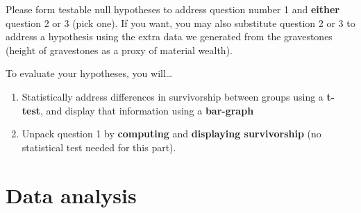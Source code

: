 \documentclass[]{krantz}
\providecommand{\tightlist}{%
  \setlength{\itemsep}{0pt}\setlength{\parskip}{0pt}}
\theoremstyle{definition}
\theoremstyle{definition}
\theoremstyle{definition}
\theoremstyle{remark}
\begin{document}
Please form testable null hypotheses to address question number 1 and
\textbf{either} question 2 or 3 (pick one). If you want, you may also
substitute question 2 or 3 to address a hypothesis using the extra data
we generated from the gravestones (height of gravestones as a proxy of
material wealth).

To evaluate your hypotheses, you will\ldots{}

\begin{enumerate}
\def\labelenumi{\arabic{enumi}.}
\tightlist
\item
  Statistically address differences in survivorship between groups using
  a \textbf{t-test}, and display that information using a
  \textbf{bar-graph}
\item
  Unpack question 1 by \textbf{computing} and \textbf{displaying
  survivorship} (no statistical test needed for this part).
\end{enumerate}

\section{Data analysis}\label{data-analysis}
\end{document}
